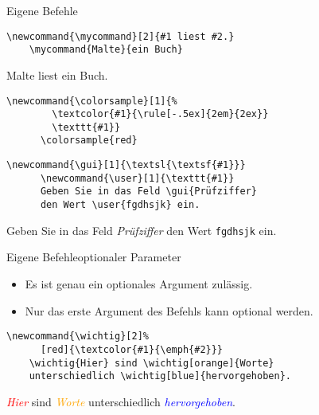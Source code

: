 \begin{Frame}[fragile]{Eigene Befehle}
  \begin{lstlisting}[gobble=4,morekeywords={mycommand}]
    \newcommand{\mycommand}[2]{#1 liest #2.}
    \mycommand{Malte}{ein Buch}
  \end{lstlisting}
  \newcommand{\mycommand}[2]{#1 liest #2.}
  \mycommand{Malte}{ein Buch}

  \xxx\pause

  \begin{Beispiel}
    \begin{lstlisting}[gobble=6,style=block,morekeywords={colorsample}]
      \newcommand{\colorsample}[1]{%
        \textcolor{#1}{\rule[-.5ex]{2em}{2ex}}
        \texttt{#1}}
      \colorsample{red}
    \end{lstlisting}
  \end{Beispiel}

  \pause

  \begin{Beispiel}
    \begin{lstlisting}[gobble=6,style=block,morekeywords={user,gui}]
      \newcommand{\gui}[1]{\textsl{\textsf{#1}}}
      \newcommand{\user}[1]{\texttt{#1}}
      Geben Sie in das Feld \gui{Prüfziffer}
      den Wert \user{fgdhsjk} ein.
    \end{lstlisting}
    \newcommand{\gui}[1]{\textsl{\textsf{#1}}}
    \newcommand{\user}[1]{\texttt{#1}}
    \textrm{Geben Sie in das Feld \gui{Prüfziffer}
    den Wert \user{fgdhsjk} ein.}
  \end{Beispiel}
\end{Frame}

\begin{Frame}[fragile]{Eigene Befehle}{optionaler Parameter}
  \begin{itemize}
    \item Es ist \alert{genau ein} optionales Argument zulässig.
    \item Nur das \alert{erste Argument} des Befehls kann optional werden.
  \end{itemize}

  \xxx

  \begin{lstlisting}[gobble=4,morekeywords={wichtig}]
    \newcommand{\wichtig}[2]%
      [red]{\textcolor{#1}{\emph{#2}}}
    \wichtig{Hier} sind \wichtig[orange]{Worte}
    unterschiedlich \wichtig[blue]{hervorgehoben}.
  \end{lstlisting}
  \newcommand{\wichtig}[2]%
    [red]{\textcolor{#1}{\emph{#2}}}
  \wichtig{Hier} sind \wichtig[orange]{Worte}
  unterschiedlich \wichtig[blue]{hervorgehoben}.
\end{Frame}

